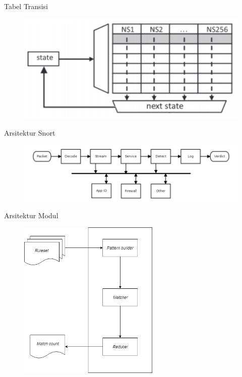 \documentclass[10pt,xcolor=table]{beamer}
\begin{document}
\begin{frame}{Tabel Transisi}
    \begin{figure}
        \centering
        \includegraphics[width=1.0\textwidth]{../src/resources/table.png}
    \end{figure}
\end{frame}

\begin{frame}{Arsitektur Snort}
    \begin{figure}
        \centering
        \includegraphics[width=1.0\textwidth]{../src/resources/snort3.png}
    \end{figure}
\end{frame}

\begin{frame}{Arsitektur Modul}
    \begin{figure}
        \centering
        \includegraphics[width=0.6\textwidth]{../src/resources/module-arch.png}
    \end{figure}
\end{frame}
\end{document}
